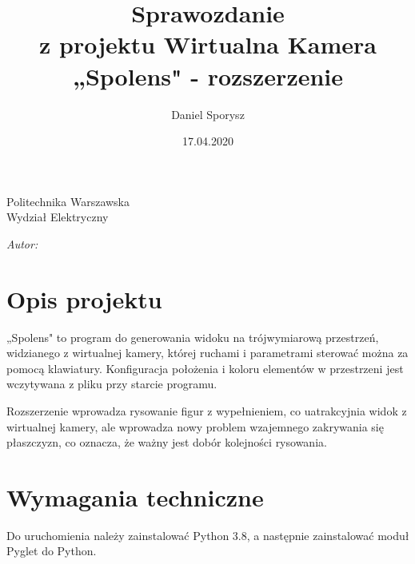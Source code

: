 \documentclass[12pt]{article}
\title{Sprawozdanie\\z projektu Wirtualna Kamera\\„Spolens" - rozszerzenie}
\author{Daniel Sporysz}
\date{17.04.2020}
\begin{document}
\makeatletter
\newcommand{\linia}{\rule{\linewidth}{0.4mm}}
\renewcommand{\maketitle}{\begin{titlepage}
    \begin{center}\LARGE
    Politechnika Warszawska\\Wydział Elektryczny
    \end{center}
    \vspace{4cm}
    \noindent
    \begin{center}
      \LARGE \textsc{\@title}
         \end{center}
    \vspace{4cm}
    \begin{flushright}
    \begin{minipage}{5cm}
    \textit{Autor:}\\
    \normalsize \textsc{\@author} \par
    \end{minipage}
     \end{flushright}
    \vspace*{\stretch{6}}
    \begin{center}
    \vspace*{\fill}
    \@date
    \end{center}
  \end{titlepage}%
}
\makeatother

\maketitle
\newpage

\tableofcontents
\newpage

\section{Opis projektu}
„Spolens" to program do generowania widoku na trójwymiarową przestrzeń, widzianego z wirtualnej kamery, której ruchami i parametrami sterować można za pomocą klawiatury.
Konfiguracja położenia i koloru elementów w przestrzeni jest wczytywana z pliku przy starcie programu.

Rozszerzenie wprowadza rysowanie figur z wypełnieniem, co uatrakcyjnia widok z wirtualnej kamery, ale wprowadza nowy problem wzajemnego zakrywania się płaszczyzn, co oznacza, że ważny jest dobór kolejności rysowania.

\section{Wymagania techniczne}
Do uruchomienia należy zainstalować Python 3.8, a następnie zainstalować moduł Pyglet do Python.
\end{document}
